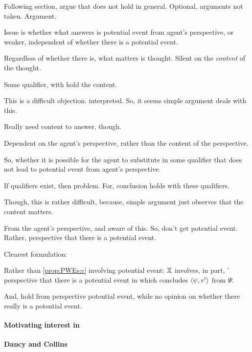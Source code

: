 \begin{note}
  Following section, argue that \ptivity{} does not hold in general.
  Optional, arguments not taken.
  Argument.
\end{note}

\begin{note}
  Issue is whether what answers \qzS{} is potential event from agent's perspective, or  weaker, independent of whether there is a potential event.

  Regardless of whether there is, what matters is thought.
  Silent on the \emph{content} of the thought.

  Some qualifier, with hold the content.

  This is a difficult objection.
  \qzS{} interpreted.
  So, it seems simple argument deals with this.

  Really need content to answer, though.

  Dependent on the agent's perspective, rather than the content of the perspective.

  So, whether it is possible for the agent to substitute in some qualifier that does not lead to potential event from agent's perspective.

  If qualifiers exist, then problem.
  For, conclusion holds with these qualifiers.

  Though, this is rather difficult, because, simple argument just observes that the content matters.

  From the agent's perspective, and aware of this.
  So, don't get potential event.
  Rather, perspective that there is a potential event.

  Clearest formulation:

  Rather than \ref{prop:PWEs:c} involving potential event:
  {
    \color{red}
    \(\qzSaV{}\) involves, in part, \vAgent{}' perspective that there is a potential event in which \vAgent{} concludes \(\pv{\psi}{v'}\) from \(\Psi\).
  }

  And, hold from perspective potential event, while no opinion on whether there really is a potential event.
\end{note}

\paragraph{Motivating interest in \ptivity{}}

\paragraph{Dancy and Collins}

